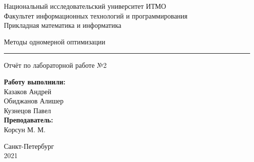 \documentclass{article}
\begin{document}
\begin{center}
    Национальный исследовательский университет ИТМО \\
    Факультет информационных технологий и программирования \\
    Прикладная математика и информатика
\end{center}
\vspace{20em}
\begin{center}
    {\Large Методы одномерной оптимизации}
    \vspace{3pt}
    \hrule
    \vspace{3pt}
    Отчёт по лабораторной работе №2
\end{center}
\vspace{20em}
\begin{flushright}
\textbf{ Работу выполнили: } \\
Казаков Андрей \\
Обиджанов Алишер \\
Кузнецов Павел \\
\vspace{1em}
\textbf{ Преподаватель: } \\
Корсун М. М.
\end{flushright}
\vspace{12em}
\begin{center}
    Санкт-Петербург \\
    2021
\end{center}
\newpage
\end{document}
